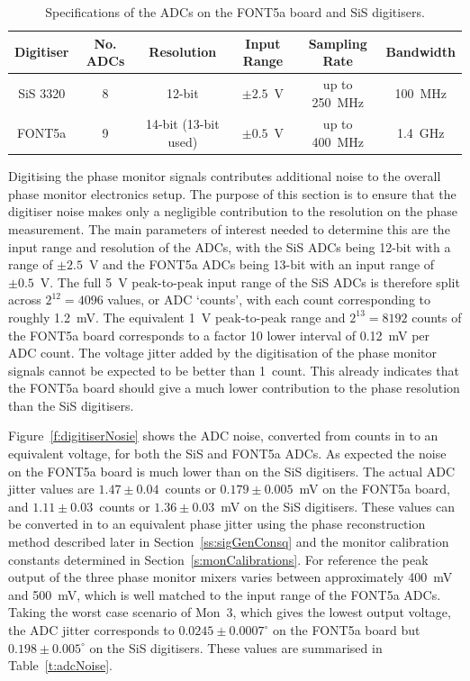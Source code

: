 \begin{table}
  \begin{center}
    \begin{tabular}{|c c c c c c|}
	   \hline
       Digitiser & No. ADCs & Resolution & Input Range & Sampling Rate & Bandwidth \\ \hline
       SiS 3320 & 8 & 12-bit & \(\pm2.5\)~V & up to 250~MHz & 100~MHz\\
       FONT5a & 9 & 14-bit (13-bit used) & \(\pm0.5\)~V & up to 400~MHz & 1.4~GHz\\ \hline
    \end{tabular}
    \caption{Specifications of the ADCs on the FONT5a board and SiS digitisers.}
  	\label{t:adcSpecs}
  \end{center}
\end{table}

Digitising the phase monitor signals contributes additional noise to the overall phase monitor electronics setup. The purpose of this section is to ensure that the digitiser noise makes only a negligible contribution to the resolution on the phase measurement. The main parameters of interest needed to determine this are the input range and resolution of the ADCs, with the SiS ADCs being 12-bit with a range of \(\pm2.5\)~V and the FONT5a ADCs being 13-bit with an input range of \(\pm0.5\)~V. The full 5~V peak-to-peak input range of the SiS ADCs is therefore split across \(2^{12}=4096\) values, or ADC `counts', with each count corresponding to roughly 1.2~mV. The equivalent 1~V peak-to-peak range and \(2^{13}=8192\) counts of the FONT5a board corresponds to a factor 10 lower interval of 0.12~mV per ADC count. The voltage jitter added by the digitisation of the phase monitor signals cannot be expected to be better than 1~count. This already indicates that the FONT5a board should give a much lower contribution to the phase resolution than the SiS digitisers.

Figure~\ref{f:digitiserNosie} shows the ADC noise, converted from counts in to an equivalent voltage, for both the SiS and FONT5a ADCs. As expected the noise on the FONT5a board is much lower than on the SiS digitisers. The actual ADC jitter values are \(1.47\pm0.04\)~counts or \(0.179\pm0.005\)~mV on the FONT5a board, and \(1.11\pm0.03\)~counts or \(1.36\pm0.03\)~mV on the SiS digitisers. These values can be converted in to an equivalent phase jitter using the phase reconstruction method described later in Section~\ref{ss:sigGenConsq} and the monitor calibration constants determined in Section~\ref{s:monCalibrations}. For reference the peak output of the three phase monitor mixers varies between approximately 400~mV and 500~mV, which is well matched to the input range of the FONT5a ADCs. Taking the worst case scenario of Mon~3, which gives the lowest output voltage, the ADC jitter corresponds to \(0.0245\pm0.0007^\circ\) on the FONT5a board but \(0.198\pm0.005^\circ\) on the SiS digitisers. These values are summarised in Table~\ref{t:adcNoise}.

